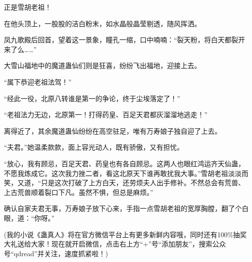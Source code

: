 \begin{this_body}
正是雪胡老祖！

在他头顶上，一股股的洁白粉末，如水晶般晶莹剔透，随风挥洒。

凤九歌殿后回首，望着这一景象，瞳孔一缩，口中喃喃：“裂天粉，将白天都裂开来了么……”

大雪山福地中的魔道蛊仙们则是狂喜，纷纷飞出福地，迎接上去。

“属下恭迎老祖法驾！”

“经此一役，北原八转谁是第一的争论，终于尘埃落定了！”

“老祖法力无边，北原第一！打得药皇、百足天君都灰溜溜地逃走！”

离得近了，其余魔道蛊仙纷纷在高空驻足，唯有万寿娘子独自迎了上去。

“夫君。”她温柔款款，面上容光动人，既有骄傲，又有担忧。

“放心，我有顾忌，百足天君、药皇也有各自顾忌。这两人也眼红鸿运齐天仙蛊，不愿我炼成它。这次我力挫二者，看这北原天下谁再敢扰我大事。”雪胡老祖淡淡而笑，又道，“只是这次打破了上方白天，还劳烦夫人出手修补。不然总会有荒兽、上古荒兽顺着裂口下凡。虽然不惧，但总是麻烦。”

确认自家夫君无事，万寿娘子放下心来，手指一点雪胡老祖的宽厚胸膛，翻了个白眼，道：“你呀。”

(我的小说《蛊真人》将在官方微信平台上有更多新鲜内容哦，同时还有100\%抽奖大礼送给大家！现在就开启微信，点击右上方“+”号“添加朋友”，搜索公众号“qdread”并关注，速度抓紧啦！)

\end{this_body}

